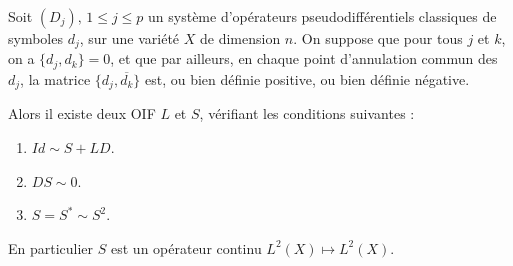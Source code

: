 \begin{prop}
  Soit $(D_j),\,1\leq j\leq p$ un système d'opérateurs pseudodifférentiels classiques de symboles $d_j$, sur une variété $X$ de dimension $n$. On suppose que pour tous $j$ et $k$, on a $\{d_j,d_k\}=0$, et que par ailleurs, en chaque point d'annulation commun des $d_j$, la matrice $\{d_j, \overline{d_k}\}$ est, ou bien définie positive, ou bien définie négative.
  
  \noindent Alors il existe deux OIF $L$ et $S$, vérifiant les conditions suivantes :
  
  \begin{enumerate}
    \item $Id \sim S + LD$.
    \item $DS \sim 0$.
    \item $S=S^* \sim S^2$.
  \end{enumerate}
  
  \noindent En particulier $S$ est un opérateur continu $L^2(X) \mapsto L^2(X)$.
\end{prop}
